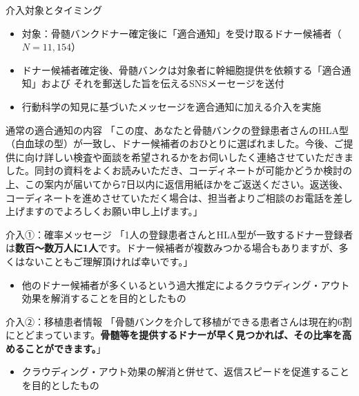 \documentclass[
      aspectratio=169,
        12pt,
    ]{beamer}
\renewcommand{\textbf}[1]{{\color{DarkBlue}\bfseries#1}}
\providecommand{\tightlist}{%
  \setlength{\itemsep}{0pt}\setlength{\parskip}{0pt}}
\begin{document}
\begin{frame}{介入対象とタイミング}
\protect\hypertarget{ux4ecbux5165ux5bfeux8c61ux3068ux30bfux30a4ux30dfux30f3ux30b0}{}
\begin{itemize}
\tightlist
\item
  対象：骨髄バンクドナー確定後に「適合通知」を受け取るドナー候補者（\(N = 11,154\)）
\item
  ドナー候補者確定後、骨髄バンクは対象者に幹細胞提供を依頼する「適合通知」および
  それを郵送した旨を伝えるSNSメーセージを送付
\item
  行動科学の知見に基づいたメッセージを適合通知に加える介入を実施
\end{itemize}
\end{frame}

\begin{frame}{通常の適合通知の内容}
\protect\hypertarget{ux901aux5e38ux306eux9069ux5408ux901aux77e5ux306eux5185ux5bb9}{}
「この度、あなたと骨髄バンクの登録患者さんのHLA型（白血球の型）が一致し、ドナー候補者のおひとりに選ばれました。今後、ご提供に向け詳しい検査や面談を希望されるかをお伺いしたく連絡させていただきました。同封の資料をよくお読みいただき、コーディネートが可能かどうか検討の上、この案内が届いてから7日以内に返信用紙ほかをご返送ください。返送後、コーディネートを進めさせていただく場合は、担当者よりご相談のお電話を差し上げますのでよろしくお願い申し上げます。」
\end{frame}

\begin{frame}{介入①：確率メッセージ}
\protect\hypertarget{ux4ecbux5165ux2460ux78baux7387ux30e1ux30c3ux30bbux30fcux30b8}{}
「1人の登録患者さんとHLA型が一致するドナー登録者は\textbf{数百〜数万人に1人}です。ドナー候補者が複数みつかる場合もありますが、多くはないこともご理解頂ければ幸いです。」

\begin{itemize}
\tightlist
\item
  他のドナー候補者が多くいるという過大推定によるクラウディング・アウト効果を解消することを目的としたもの
\end{itemize}
\end{frame}

\begin{frame}{介入②：移植患者情報}
\protect\hypertarget{ux4ecbux5165ux2461ux79fbux690dux60a3ux8005ux60c5ux5831}{}
「骨髄バンクを介して移植ができる患者さんは現在約6割にとどまっています。\textbf{骨髄等を提供するドナーが早く見つかれば、その比率を高めることができます。}」

\begin{itemize}
\tightlist
\item
  クラウディング・アウト効果の解消と併せて、返信スピードを促進することを目的としたもの
\end{itemize}
\end{frame}
\end{document}
